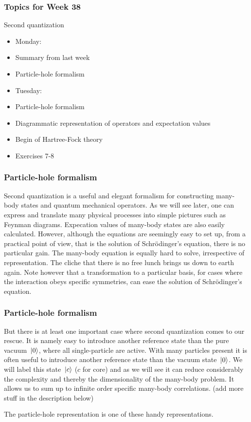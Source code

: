 \frame
{
  \frametitle{Topics for Week 38}
  \begin{block}{Second quantization}
\begin{itemize}
\item Monday:
\item Summary from last week
\item Particle-hole formalism
\item Tuesday:
\item Particle-hole formalism
\item Diagrammatic representation of operators and expectation values
\item Begin of Hartree-Fock theory
\item Exercises 7-8
\end{itemize}
  \end{block}
} 




\frame
{
  \frametitle{Particle-hole formalism}
\begin{small}
{\scriptsize
Second quantization is a useful and elegant formalism  for constructing many-body  states and 
quantum mechanical operators. As we will see later, one can express and translate many physical processes
into simple pictures such as Feynman diagrams. Expecation values of many-body states are also easily calculated.
However, although the equations are seemingly easy to set up, from  a practical point of view, that is
the solution of Schr\"odinger's equation, there is no particular gain.
The many-body equation is equally hard to solve, irrespective of representation. 
The cliche that 
there is no free lunch brings us down to earth again.  
Note however that a transformation to a particular
basis, for cases where the interaction obeys specific symmetries, can ease the solution of Schr\"odinger's equation. 
}
\end{small}
}


\frame
{
  \frametitle{Particle-hole formalism}
\begin{small}
{\scriptsize
But there is at least one important case where second quantization comes to our rescue.
It is namely easy to introduce another reference state than the pure vacuum $\,|{0}\rangle$, where all single-particle
are active.
With many particles present it is often useful to introduce another reference state  than the vacuum state 
$\,|{0}\rangle$. We will label this state $\,|{c}\rangle$ ($c$ for core) and as we will see it can reduce 
considerably the complexity and thereby the dimensionality of the many-body problem. It allows us to sum up to infinite order
specific many-body correlations. (add more stuff in the description below)

The particle-hole representation is one of these handy representations. 
}
\end{small}
}

